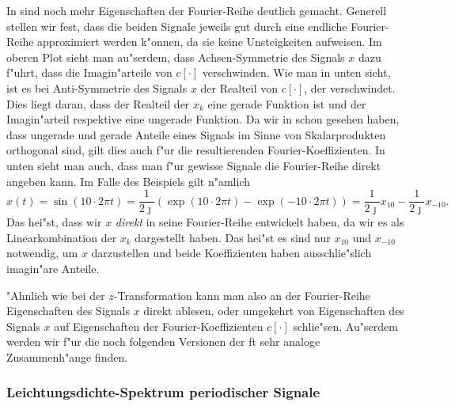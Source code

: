 In  sind noch mehr Eigenschaften der Fourier-Reihe deutlich gemacht.
Generell stellen wir fest, dass die beiden Signale jeweils gut durch eine endliche Fourier-Reihe approximiert werden k"onnen, da sie keine Unsteigkeiten aufweisen.
Im oberen Plot sieht man au"serdem, dass Achsen-Symmetrie des Signals $x$ dazu f"uhrt, dass die Imagin"arteile von $c[\cdot]$ verschwinden.
Wie man in  unten sieht, ist es bei Anti-Symmetrie des Signals $x$ der Realteil von $c[\cdot]$, der verschwindet.
Dies liegt daran, dass der Realteil der $x_k$ eine gerade Funktion ist und der Imagin"arteil respektive eine ungerade Funktion.
Da wir in  schon gesehen haben, dass ungerade und gerade Anteile eines Signals im Sinne von Skalarprodukten orthogonal sind, gilt dies auch f"ur die resultierenden Fourier-Koeffizienten.
In  unten sieht man auch, dass man f"ur gewisse Signale die Fourier-Reihe direkt angeben kann.
Im Falle des Beispiels gilt n"amlich
\[
x(t) 
    = \sin(10 \cdot 2 \pi t) 
    = \frac{1}{2 \jmath} \left(
        \exp(10 \cdot 2 \pi t) - \exp(-10 \cdot 2 \pi t)
    \right) 
    = \frac{1}{2 \jmath} x_{10} - \frac{1}{2 \jmath} x_{-10}.
\]
Das hei"st, dass wir $x$ \emph{direkt} in seine Fourier-Reihe entwickelt haben, da wir es als Linearkombination der $x_k$ dargestellt haben.
Das hei"st es sind nur $x_{10}$ und $x_{-10}$ notwendig, um $x$ darzustellen und beide Koeffizienten haben ausschlie"slich imagin"are Anteile.

"Ahnlich wie bei der $z$-Transformation kann man also an der Fourier-Reihe Eigenschaften des Signals $x$ direkt ablesen, oder umgekehrt von Eigenschaften des Signals $x$ auf Eigenschaften der Fourier-Koeffizienten $c[\cdot]$ schlie"sen.
Au"serdem werden wir f"ur die noch folgenden Versionen der \gls{ft} sehr analoge Zusammenh"ange finden.

\subsubsection{Leichtungsdichte-Spektrum periodischer Signale}

